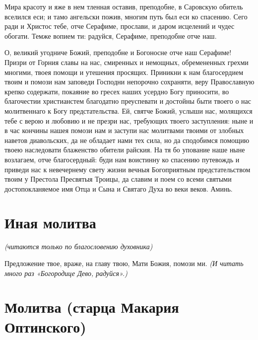 

Мира красоту и яже в нем тленная оставив, преподобне, в Саровскую обитель вселился еси; и тамо ангельски пожив, многим путь был еси ко спасению. Сего ради и Христос тебе, отче Серафиме, прослави, и даром исцелений и чудес обогати. Темже вопием ти: радуйся, Серафиме, преподобне отче наш. 



О, великий угодниче Божий, преподобне и Богоносне отче наш Серафиме! Призри от Горния славы на нас, смиренных и немощных, обремененных грехми многими, твоея помощи и утешения просящих. Приникни к нам благосердием твоим и помози нам заповеди Господни непорочно сохраняти, веру Православную крепко содержати, покаяние во гресех наших усердно Богу приносити, во благочестии христианстем благодатно преуспевати и достойны быти твоего о нас молитвеннаго к Богу предстательства. Ей, святче Божий, услыши нас, молящихся тебе с верою и любовию и не презри нас, требующих твоего заступления: ныне и в час кончины нашея помози нам и заступи нас молитвами твоими от злобных наветов диавольских, да не обладает нами тех сила, но да сподобимся помощию твоею наследовати блаженство обители райския. На тя бо упование наше ныне возлагаем, отче благосердный: буди нам воистинну ко спасению путевождь и приведи нас к невечернему свету жизни вечныя Богоприятным предстательством твоим у Престола Пресвятыя Троицы, да славим и поем со всеми святыми достопокланяемое имя Отца и Сына и Святаго Духа во веки веков. Аминь. 
\mychapterending


 

\section{Иная молитва}
 


\itshape (читаются только по благословению духовника)

\normalfont{}


Предложение твое, враже, на главу твою, Мати Божия, помози ми. \itshape (И читать много раз «Богородице Дево, радуйся».)

\normalfont{}


\section{Молитва (старца Макария Оптинского)}
 


